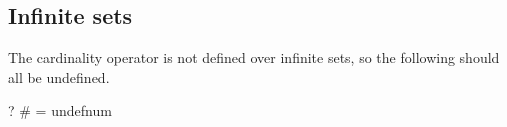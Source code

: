 \documentclass{article}
\begin{document}
\subsection{Infinite sets}
The cardinality operator is not defined over infinite sets,
so the following should all be undefined.
\begin{zed} \vdash?  \# \nat = undefnum \end{zed}
\end{document}
